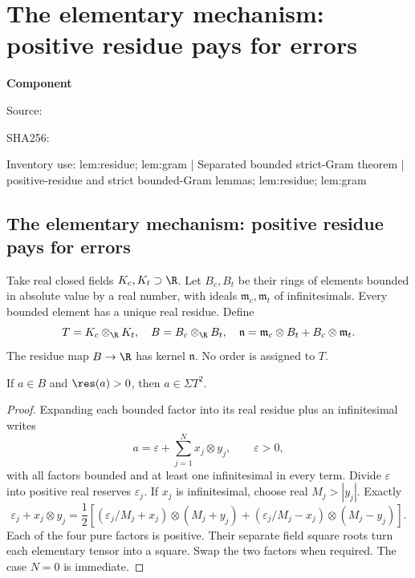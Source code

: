 \chapter{The elementary mechanism: positive residue pays for errors}
\label{component:p25af2c58da7e}
\noindent\textbf{Component }\par
{\small\noindent Source: \par}
{\small\noindent SHA256: \par}
{\small\noindent Inventory use: lem:residue; lem:gram | Separated bounded strict-Gram theorem | positive-residue and strict bounded-Gram lemmas; lem:residue; lem:gram\par}
\medskip
\section{The elementary mechanism: positive residue pays for errors}\label{p25af2c58da7e:sec:mechanism}
Take real closed fields $K_c,K_t\supset\R$. Let $B_c,B_t$ be their rings of elements bounded in absolute value by a real number, with ideals $\mathfrak m_c,\mathfrak m_t$ of infinitesimals. Every bounded element has a unique real residue. Define
\[
T=K_c\otimes_{\R}K_t,\quad B=B_c\otimes_{\R}B_t,\quad
\mathfrak n=\mathfrak m_c\otimes B_t+B_c\otimes\mathfrak m_t.
\]
The residue map $B\to\R$ has kernel $\mathfrak n$. No order is assigned to $T$.

\begin{lemma}\label{p25af2c58da7e:lem:residue}
If $a\in B$ and $\res(a)>0$, then $a\in\Sigma T^2$.
\end{lemma}
\begin{proof}
Expanding each bounded factor into its real residue plus an infinitesimal writes
\[a=\varepsilon+\sum_{j=1}^N x_j\otimes y_j,\qquad\varepsilon>0,
\]
with all factors bounded and at least one infinitesimal in every term. Divide $\varepsilon$ into positive real reserves $\varepsilon_j$. If $x_j$ is infinitesimal, choose real $M_j>|y_j|$. Exactly
\[
\varepsilon_j+x_j\otimes y_j=\frac12\left[
(\varepsilon_j/M_j+x_j)\otimes(M_j+y_j)+
(\varepsilon_j/M_j-x_j)\otimes(M_j-y_j)\right].
\]
Each of the four pure factors is positive. Their separate field square roots turn each elementary tensor into a square. Swap the two factors when required. The case $N=0$ is immediate.
\end{proof}

